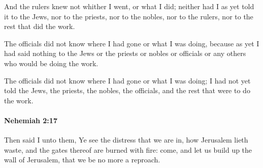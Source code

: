 			\begin{versebox}
					\item[BHS] 
					\item[LXX] 
					\item[ASV] And the rulers knew not whither I went, or what I did; neither had I as yet told it to the Jews, nor to the priests, nor to the nobles, nor to the rulers, nor to the rest that did the work.
					\item[NIV] The officials did not know where I had gone or what I was doing, because as yet I had said nothing to the Jews or the priests or nobles or officials or any others who would be doing the work.
					\item[NRSV] The officials did not know where I had gone or what I was doing; I had not yet told the Jews, the priests, the nobles, the officials, and the rest that were to do the work.
			\end{versebox}

		\paragraph{Nehemiah 2:17} %
			\label{NEHEMIAH-2-17}

			Then said I unto them, Ye see the distress that we are in, how Jerusalem lieth waste, and the gates thereof are burned with fire: come, and let us build up the wall of Jerusalem, that we be no more a reproach.

